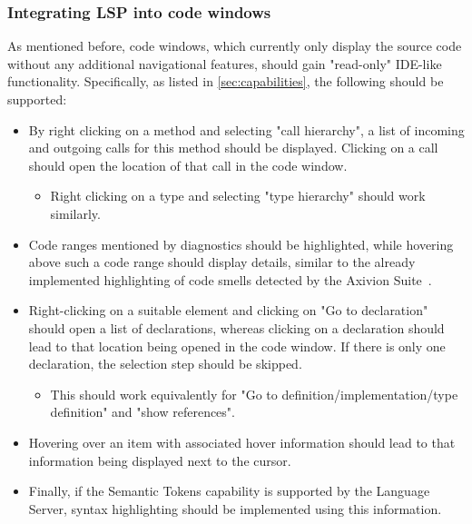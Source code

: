 \documentclass{scrartcl}
\begin{document}
{\subsubsection{Integrating LSP into code windows}\label{subsubsec:window}
As mentioned before, code windows, which currently only display the source code without any additional navigational features, should gain "read-only" IDE-like functionality.
Specifically, as listed in \cref{sec:capabilities}, the following should be supported:
\begin{itemize}
	\item By right clicking on a method and selecting "call hierarchy", a list of incoming and outgoing calls for this method should be displayed.
	      Clicking on a call should open the location of that call in the code window.
	      \begin{itemize}
		      \item Right clicking on a type and selecting "type hierarchy" should work similarly.
	      \end{itemize}
	\item Code ranges mentioned by diagnostics should be highlighted, while hovering above such a code range should display details, similar to the already implemented highlighting of code smells detected by the Axivion Suite~\cite{falko}.
	\item Right-clicking on a suitable element and clicking on "Go to declaration" should open a list of declarations, whereas clicking on a declaration should lead to that location being opened in the code window.
	      If there is only one declaration, the selection step should be skipped.
	      \begin{itemize}
		      \item This should work equivalently for "Go to definition/implementation/type definition" and "show references".
	      \end{itemize}
	\item Hovering over an item with associated hover information should lead to that information being displayed next to the cursor.
	\item Finally, if the Semantic Tokens capability is supported by the Language Server, syntax highlighting should be implemented using this information.
\end{itemize}

}
\end{document}
